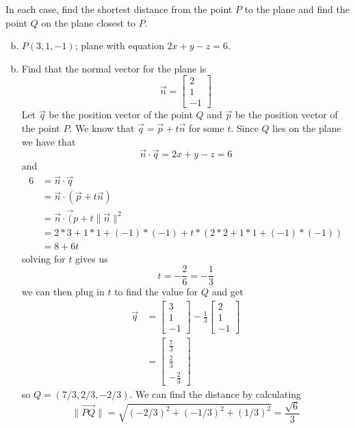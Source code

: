\documentclass[../main.tex]{subfiles}
\begin{document}
In each case, find the shortest distance from the point $P$ to the plane and find the point $Q$ on the plane closest to $P$.
\begin{enumerate}[a)]
	\setcounter{enumi}{1}
	\item $P(3, 1, -1)$; plane with equation $2x + y - z = 6$.
\end{enumerate}

\solution
\begin{enumerate}[a)]
	\setcounter{enumi}{1}
	\item Find that the normal vector for the plane is 
        \[ \vec{n} = \begin{bmatrix}2\\1\\-1\end{bmatrix} \]
          Let $\vec{q}$ be the position vector of the point $Q$ and $\vec{p}$ be
          the position vector of the point $P$. We know that $\vec{q} = \vec{p}+t\vec{n}$ for some $t$.
          Since $Q$ lies on the plane we have that 
          \[ \vec{n} \cdot \vec{q} = 2x + y - z = 6 \]
          and
          \begin{align*} 
                6   &= \vec{n} \cdot \vec{q}\\ 
                    &= \vec{n} \cdot (\vec{p} + t\vec{n})\\
                    &= \vec{n} \cdot \vec({p} + t\| \vec{n} \|^2\\
                    &= 2*3 + 1*1 + (-1)*(-1) + t*(2*2+1*1+(-1)*(-1))\\
                    &= 8+6t
          \end{align*}
          solving for $t$ gives us
          \[ t = -\frac{2}{6} = -\frac{1}{3} \]
          we can then plug in $t$ to find the value for $Q$ and get
          \begin{align*}
            \vec{q} &= \begin{bmatrix}3\\1\\-1\end{bmatrix}-\frac{1}{3}\begin{bmatrix}2\\1\\-1\end{bmatrix}\\
                    &= \begin{bmatrix}\frac{7}{3}\\\frac{2}{3}\\-\frac{2}{3}\end{bmatrix}
          \end{align*}
          so $Q = (7/3, 2/3, -2/3)$. We can find the distance by calculating
          \[ \|\vec{PQ}\| = \sqrt{(-2/3)^2 + (-1/3)^2 + (1/3)^2} = \frac{\sqrt{6}}{3} \]
\end{enumerate}
\end{document}
